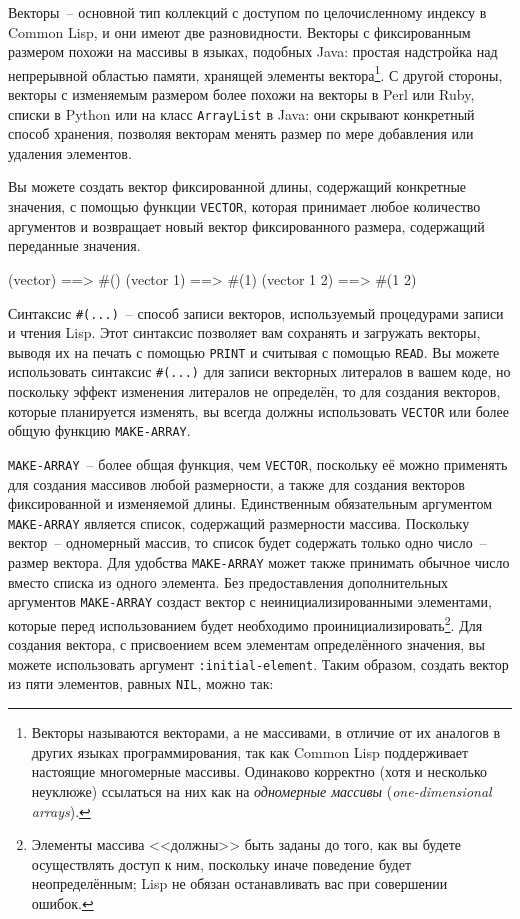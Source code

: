 Векторы~-- основной тип коллекций с доступом по целочисленному индексу в Common Lisp, и они
имеют две разновидности.  Векторы с фиксированным размером похожи на массивы в языках,
подобных Java: простая надстройка над непрерывной областью памяти, хранящей элементы
вектора\footnote{Векторы называются векторами, а не массивами, в отличие от их аналогов в других
  языках программирования, так как Common Lisp поддерживает настоящие многомерные
  массивы.  Одинаково корректно (хотя и несколько неуклюже) ссылаться на них как на
  \textit{одномерные массивы} (\textit{one-dimensional arrays}).}. С другой стороны,
векторы с изменяемым размером более похожи на векторы в Perl или Ruby, списки в Python
или на класс \lstinline{ArrayList} в Java: они скрывают конкретный способ хранения, позволяя
векторам менять размер по мере добавления или удаления элементов.

Вы можете создать вектор фиксированной длины, содержащий конкретные значения, с помощью
функции \lstinline{VECTOR}, которая принимает любое количество аргументов и возвращает
новый вектор фиксированного размера, содержащий переданные значения.

\begin{myverb}
(vector)     ==> #()
(vector 1)   ==> #(1)
(vector 1 2) ==> #(1 2)
\end{myverb}

Синтаксис \lstinline!#(...)!~-- способ записи векторов, используемый процедурами
записи и чтения Lisp.  Этот синтаксис позволяет вам сохранять и загружать векторы,
выводя их на печать с помощью \lstinline{PRINT} и считывая с помощью \lstinline{READ}.
Вы можете использовать синтаксис \lstinline!#(...)! для
записи векторных литералов в вашем коде, но поскольку эффект изменения литералов не определён,
то для создания векторов, которые планируется изменять, вы всегда должны 
использовать \lstinline{VECTOR} или более общую функцию \lstinline{MAKE-ARRAY}.

\lstinline{MAKE-ARRAY}~-- более общая функция, чем \lstinline{VECTOR}, поскольку её можно
применять для создания массивов любой размерности, а также для создания векторов
фиксированной и изменяемой длины. Единственным обязательным аргументом \lstinline{MAKE-ARRAY}
является список, содержащий размерности массива.  Поскольку вектор~-- одномерный массив,
то список будет содержать только одно число~-- размер вектора.  Для удобства
\lstinline{MAKE-ARRAY} может также принимать обычное число вместо списка из одного элемента.
Без предоставления дополнительных аргументов \lstinline{MAKE-ARRAY} создаст вектор с
неинициализированными элементами, которые перед использованием будет необходимо
проинициализировать\footnote{Элементы массива <<должны>> быть заданы до того, как вы будете осуществлять
  доступ к ним, поскольку иначе поведение будет неопределённым; Lisp не обязан
  останавливать вас при совершении ошибок.}.  Для создания вектора, с присвоением всем
элементам определённого значения, вы можете использовать аргумент \lstinline{:initial-element}.
Таким образом, создать вектор из пяти элементов, равных \lstinline{NIL}, можно так:

